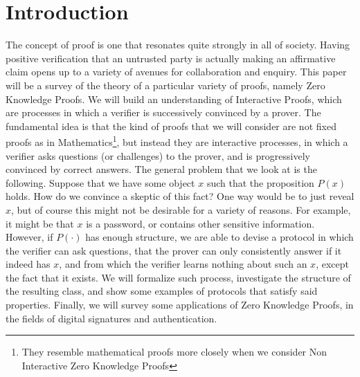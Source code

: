 \documentclass{article}
\begin{document}
\section{Introduction}
The concept of proof is one that resonates quite strongly in all of society. Having positive verification that
an untrusted party is actually making an affirmative claim opens up to a variety of avenues for collaboration and
enquiry. This paper will be a survey of the theory of a particular variety of proofs, namely Zero Knowledge Proofs.
We will build an understanding of Interactive Proofs, which are processes in which a verifier is successively convinced
by a prover. The fundamental idea is that the kind of proofs that we will consider are not fixed proofs as in Mathematics\footnote{They resemble mathematical proofs more closely when we consider Non Interactive Zero Knowledge Proofs},
but instead they are interactive processes, in which a verifier asks questions (or challenges) to the prover, and is progressively
convinced by correct answers.
The general problem that we look at is the following. Suppose that we have some object $x$ such that the proposition
$P(x)$ holds. How do we convince a skeptic of this fact? One way would be to just reveal $x$, but of course this
might not be desirable for a variety of reasons. For example, it might be that $x$ is a password, or contains other sensitive
information.  However, if $P(\cdot)$ has enough structure, we are able to devise a protocol in which the verifier can ask questions,
that the prover can only consistently answer if it indeed has $x$, and from which the verifier learns nothing about such an $x$,
except the fact that it exists. We will formalize such process, investigate the structure of the resulting class, and show some examples of protocols that satisfy said properties.
Finally, we will survey some applications of Zero Knowledge Proofs, in the fields of digital signatures and authentication.
\end{document}
